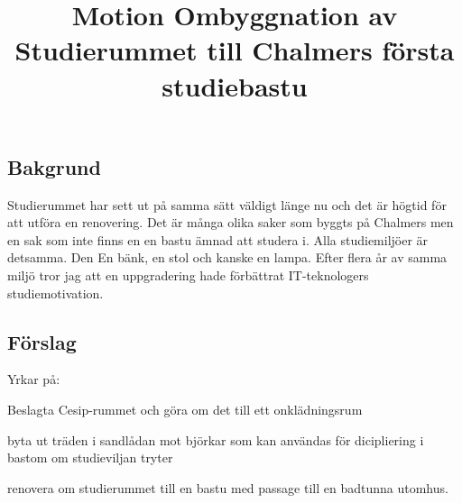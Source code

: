 \documentclass[11pt, noincludeaddress, nopagination]{classes/cthit}
\begin{document}
\title{Motion Ombyggnation av Studierummet till Chalmers första studiebastu}

\makeheadfoot%

\makesimpletitle

\subsection*{Bakgrund}
Studierummet har sett ut på samma sätt väldigt länge nu och det är högtid för att utföra en renovering. Det är många olika saker som byggts på Chalmers men en sak som inte finns en en bastu ämnad att studera i. Alla studiemiljöer är detsamma. Den En bänk, en stol och kanske en lampa. Efter flera år av samma miljö tror jag att en uppgradering hade förbättrat IT-teknologers studiemotivation.

\subsection*{Förslag}
Yrkar på:
\begin{att}
	\item Beslagta Cesip-rummet och göra om det till ett onklädningsrum
	\item byta ut träden i sandlådan mot björkar som kan användas för dicipliering i bastom om studieviljan tryter
	\item renovera om studierummet till en bastu med passage till en badtunna utomhus.
\end{att}
\end{document}

